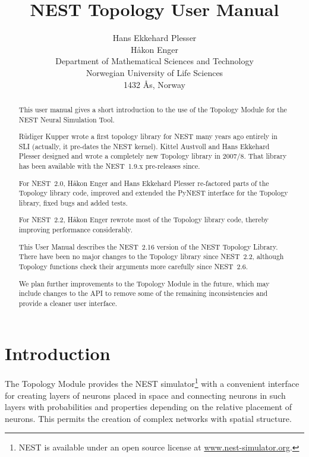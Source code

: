 \documentclass[a4paper,12pt]{report}
\title{NEST Topology User Manual}
\author{Hans Ekkehard Plesser\\[1ex]
Håkon Enger\\[1ex]
\normalsize Department of Mathematical Sciences and Technology\\\normalsize Norwegian University of Life Sciences\\
\normalsize 1432 Ås, Norway}
\date{NEST 2.16\\[8cm]
\centerline{\texttt{[image: nest-initiative.pdf]}}}
\begin{document}
\maketitle

\begin{abstract}
  This user manual gives a short introduction to the use of the
  Topology Module for the NEST Neural Simulation Tool.

  Rüdiger Kupper wrote a first topology library for NEST many years
  ago entirely in SLI (actually, it pre-dates the NEST kernel).  Kittel
  Austvoll and Hans Ekkehard Plesser designed and wrote a completely
  new Topology library in 2007/8. That library has been available with
  the NEST~1.9.x pre-releases since.

  For NEST~2.0, Håkon Enger and Hans Ekkehard Plesser re-factored
  parts of the Topology library code, improved and extended the PyNEST
  interface for the Topology library, fixed bugs and added tests.

  For NEST~2.2, Håkon Enger rewrote most of the Topology library code,
  thereby improving performance considerably.

  This User Manual describes the NEST~2.16 version of the NEST Topology
  Library. There have been no major changes to the Topology library since
  NEST~2.2, although Topology functions check their arguments more carefully
  since NEST~2.6.

  We plan further improvements to the Topology Module in the future,
  which may include changes to the API to remove some of the remaining
  inconsistencies and provide a cleaner user interface.

\end{abstract}

\tableofcontents

\chapter{Introduction}\label{sec:intro}

The Topology Module provides the NEST simulator\footnote{NEST is
  available under an open source license at
\url{www.nest-simulator.org}.}
\citep{Gewa:2007(1430)} with a convenient interface for creating
layers of neurons placed in space and connecting neurons in such
layers with probabilities and properties depending on the relative
placement of neurons.  This permits the creation of complex networks
with spatial structure.
\end{document}
